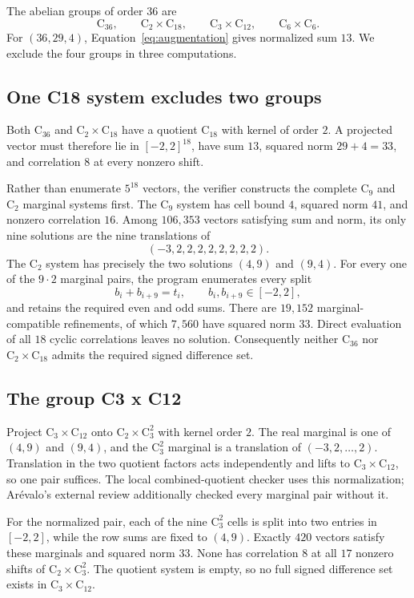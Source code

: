 \documentclass[11pt]{article}
\theoremstyle{remark}
\newcommand{\C}{\mathrm{C}}
\begin{document}
The abelian groups of order $36$ are
\[
    \C_{36},\qquad \C_2\times\C_{18},\qquad
    \C_3\times\C_{12},\qquad \C_6\times\C_6.
\]
For $(36,29,4)$, Equation~\eqref{eq:augmentation} gives normalized sum $13$.
We exclude the four groups in three computations.

\subsection{One C18 system excludes two groups}

Both $\C_{36}$ and $\C_2\times\C_{18}$ have a quotient $\C_{18}$ with kernel
of order $2$.  A projected vector must therefore lie in $[-2,2]^{18}$, have
sum $13$, squared norm $29+4=33$, and correlation $8$ at every nonzero shift.

Rather than enumerate $5^{18}$ vectors, the verifier constructs the complete
$\C_9$ and $\C_2$ marginal systems first.  The $\C_9$ system has cell bound
$4$, squared norm $41$, and nonzero correlation $16$.  Among $106{,}353$
vectors satisfying sum and norm, its only nine solutions are the nine
translations of
\[
    (-3,2,2,2,2,2,2,2,2).
\]
The $\C_2$ system has precisely the two solutions $(4,9)$ and $(9,4)$.
For every one of the $9\cdot2$ marginal pairs, the program enumerates every
split
\[
    b_i+b_{i+9}=t_i,\qquad b_i,b_{i+9}\in[-2,2],
\]
and retains the required even and odd sums.  There are $19{,}152$
marginal-compatible refinements, of which $7{,}560$ have squared norm $33$.
Direct evaluation of all $18$ cyclic correlations leaves no solution.
Consequently neither $\C_{36}$ nor $\C_2\times\C_{18}$ admits the required
signed difference set.

\subsection{The group C3 x C12}

Project $\C_3\times\C_{12}$ onto $\C_2\times\C_3^2$ with kernel order $2$.
The real marginal is one of $(4,9)$ and $(9,4)$, and the $\C_3^2$ marginal is
a translation of $(-3,2,\ldots,2)$.  Translation in the two quotient factors
acts independently and lifts to $\C_3\times\C_{12}$, so one pair suffices.
The local combined-quotient checker uses this normalization; Ar\'evalo's
external review additionally checked every marginal pair without it.

For the normalized pair, each of the nine $\C_3^2$ cells is split into two
entries in $[-2,2]$, while the row sums are fixed to $(4,9)$.  Exactly $420$
vectors satisfy these marginals and squared norm $33$.  None has correlation
$8$ at all $17$ nonzero shifts of $\C_2\times\C_3^2$.  The quotient system is
empty, so no full signed difference set exists in $\C_3\times\C_{12}$.
\end{document}
